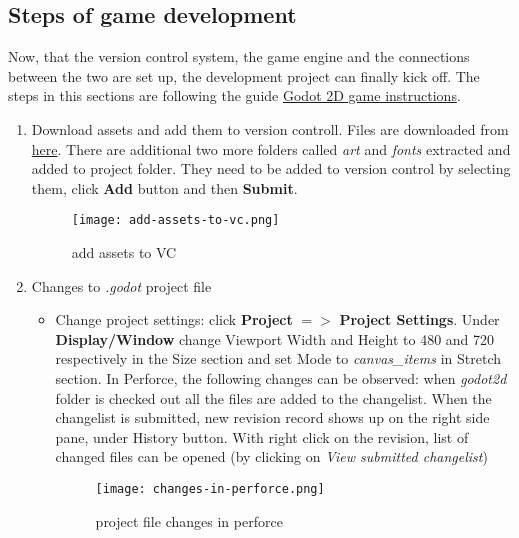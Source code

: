 \subsection{Steps of game development}
Now, that the version control system, the game engine and the connections between the two are set up, the
development project can finally kick off. The steps in this sections are following the guide 
\href{https://docs.godotengine.org/en/stable/getting_started/first_2d_game/index.html}{\color{blue}Godot 2D game instructions}.
\begin{enumerate}
    \item Download assets and add them to version controll. Files are downloaded from 
    \href{https://github.com/godotengine/godot-docs-project-starters/releases/download/latest-4.x/dodge_the_creeps_2d_assets.zip}{\color{blue}here}.
    There are additional two more folders called \textit{art} and \textit{fonts} extracted and added to project folder.
    They need to be added to version control by selecting them, click \textbf{Add} button and then \textbf{Submit}.
    \begin{figure}[H]
        \centering
        \texttt{[image: add-assets-to-vc.png]}
          \caption{add assets to VC}
          \label{fig:add-assets-to-vc}
    \end{figure}
    \item Changes to \textit{.godot} project file
    \begin{itemize}
        \item Change project settings: click \textbf{Project} {$=>$} \textbf{Project Settings}. Under \textbf{Display/Window}
        change Viewport Width and Height to 480 and 720 respectively in the Size section and set Mode to \textit{canvas\_items}
        in Stretch section. In Perforce, the following changes can be observed: when \textit{godot2d} folder is checked out
        all the files are added to the changelist. When the changelist is submitted, new revision record shows up on the 
        right side pane, under History button. With right click on the revision, list of changed files can be opened (by
        clicking on \textit{View submitted changelist}) 
        \begin{figure}[H]
            \centering
            \texttt{[image: changes-in-perforce.png]}
              \caption{project file changes in perforce}
              \label{fig:changes-in-perforce}
        \end{figure}
    \end{itemize}

\end{enumerate}
